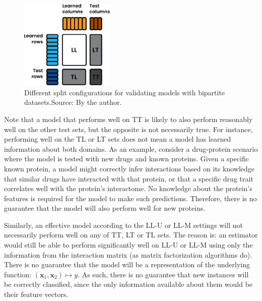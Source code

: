 \begin{figure}
    \centering
    \includegraphics[width=0.4\textwidth]{figures/train_test_split.pdf}
    \caption{Different split configurations for validating models with bipartite datasets.\newline Source: By the author.}
    \label{fig:bipartite test sets}
\end{figure}

Note that a model that performs well on TT is likely to also perform reasonably well on the other test sets, but the opposite is not necessarily true.
%
For instance, performing well on the TL or LT sets does not mean a model has learned information about both domains. As an example, consider a drug-protein scenario where the model is tested with new drugs and known proteins. Given a specific known protein, a model might correctly infer interactions based on its knowledge that similar drugs have interacted with that protein, or that a specific drug trait correlates well with the protein's interactome. No knowledge about the protein's features is required for the model to make such predictions.
Therefore, there is no guarantee that the model will also perform well for new proteins.

Similarly, an effective model according to the LL-U or LL-M settings will not necessarily perform well on any of TT, LT or TL sets. The reason is: an estimator would still be able to perform significantly well on LL-U or LL-M using only the information from the interaction matrix (as matrix factorization algorithms do). There is no guarantee that the model will be a representation of the underlying function: $(\mathbf{x}_1, \mathbf{x}_2) \mapsto y$. As such, there is no guarantee that new instances will be correctly classified, since the only information available about them would be their feature vectors.


